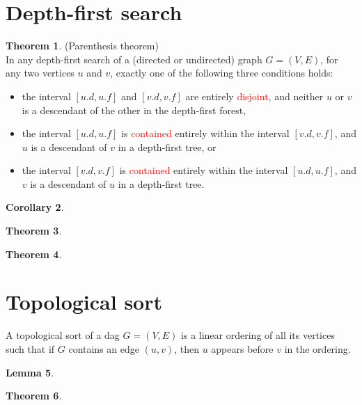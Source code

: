 \documentclass[letter]{book}
\theoremstyle{definition}
\newtheorem{theorem}{Theorem}[chapter]
\newtheorem{lemma}[theorem]{Lemma}
\newtheorem{corollary}[theorem]{Corollary}
\theoremstyle{definition}
\theoremstyle{remark}
\begin{document}
\section{Depth-first search}
    \begin{theorem} (Parenthesis theorem)\\
        In any depth-first search of a (directed or undirected) graph $G=(V,E)$, for any two vertices $u$ and $v$, exactly one of the following three conditions holds:
        \begin{itemize}
            \item the interval $[u.d, u.f]$ and $[v.d, v.f]$ are entirely \textcolor{red}{disjoint}, and neither $u$ or $v$ is a descendant of the other in the depth-first forest,
            \item the interval $[u.d, u.f]$ is \textcolor{red}{contained} entirely within the interval $[v.d, v.f]$, and $u$ is a descendant of $v$ in a depth-first tree, or
            \item the interval $[v.d, v.f]$ is \textcolor{red}{contained} entirely within the interval $[u.d, u.f]$, and $v$ is a descendant of $u$ in a depth-first tree.
        \end{itemize}
    \end{theorem}
    \bigskip
    \begin{corollary} %
    
    \end{corollary}
    \bigskip
    \begin{theorem}
        
    \end{theorem}
    \bigskip
    \begin{theorem}
        
    \end{theorem}

\section{Topological sort}
A topological sort of a dag $G=(V,E)$ is a linear ordering of all its vertices such that if $G$ contains an edge $(u,v)$, then $u$ appears before $v$ in the ordering.
\bigskip
\begin{lemma}

\end{lemma}
\bigskip
\begin{theorem}
    
\end{theorem}
\end{document}
